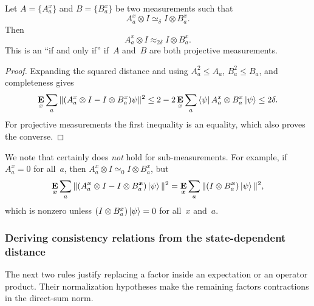 \documentclass[11pt]{article}
\theoremstyle{definition}
\newcommand{\E}{\mathop{\bf E\/}}
\newcommand{\ot}{\otimes}
\newcommand{\bx}{{\boldsymbol{x}}}
\begin{document}
\begin{proposition}\label{prop:simeq-to-approx}
Let $A = \{A^x_a\}$ and $B = \{B^x_a\}$ be two measurements such that
\begin{equation*}
A^x_a \ot I \simeq_{\delta} I \ot B^x_a.
\end{equation*}
Then
\begin{equation*}
A^x_a \ot I \approx_{2\delta} I \ot B^x_a.
\end{equation*}
This is an ``if and only if'' if~$A$ and~$B$ are both projective measurements.
\end{proposition}
\begin{proof}
Expanding the squared distance and using $A_a^2\leq A_a$,
$B_a^2\leq B_a$, and completeness gives
\[
 \E_x\sum_a\|(A_a^x\otimes I-I\otimes B_a^x)\psi\|^2
 \leq2-2\E_x\sum_a\bra\psi A_a^x\otimes B_a^x\ket\psi
 \leq2\delta.
\]
For projective measurements the first inequality is an equality,
which also proves the converse.
\end{proof}

\begin{remark}
We note that  certainly does \emph{not} hold for sub-measurements.
For example, if $A^x_a = 0$ for all~$a$,
then $A_a^x \ot I \simeq_{0} I \ot B_a^x$,
but
\begin{equation*}
\E_{\bx} \sum_a \Vert (A^{\bx}_a \ot I - I \ot B^{\bx}_a)\ket{\psi} \Vert^2
= \E_{\bx} \sum_a \Vert (I \ot B^{\bx}_a)\ket{\psi} \Vert^2,
\end{equation*}
which is nonzero unless $(I \ot B^x_a) \ket{\psi} = 0$ for all~$x$ and~$a$.
\end{remark}

\subsubsection{Deriving consistency relations from the state-dependent distance}
\label{sec:consistency-from-state-dependent-distance}

The next two rules justify replacing a factor inside an expectation
or an operator product.  Their normalization hypotheses make the
remaining factors contractions in the direct-sum norm.
\end{document}
